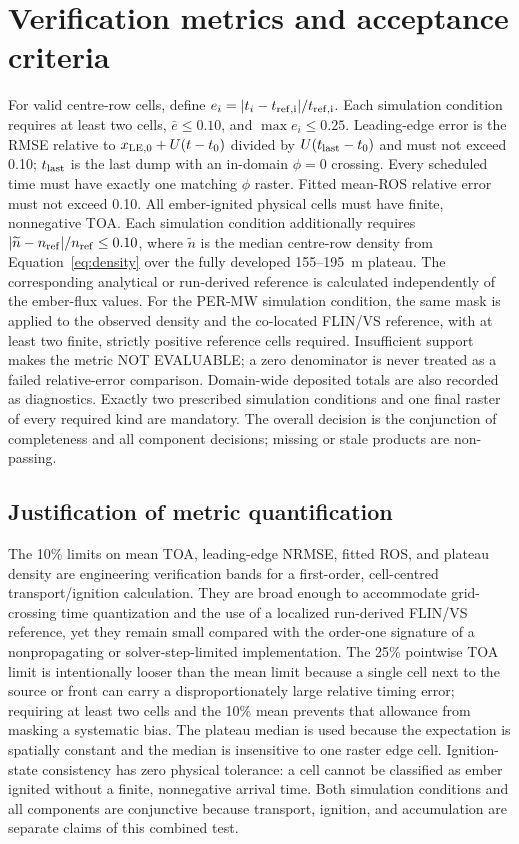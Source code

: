 \section{Verification metrics and acceptance criteria}
For valid centre-row cells, define $e_i=|t_i-t_{\rm ref,i}|/t_{\rm ref,i}$.
Each simulation condition requires at least two cells, $\bar e\le0.10$, and
$\max e_i\le0.25$. Leading-edge error is the RMSE relative to
$x_{\rm LE,0}+U(t-t_0)$ divided by $U(t_{\rm last}-t_0)$ and must not exceed
0.10; $t_{\rm last}$ is the last dump with an in-domain $\phi=0$ crossing.
Every scheduled time must have exactly one matching $\phi$ raster. Fitted mean-ROS relative
error must not exceed 0.10. All ember-ignited physical cells must have finite, nonnegative TOA.
Each simulation condition additionally requires
$|\widetilde n-n_{\rm ref}|/n_{\rm ref}\le0.10$, where
$\widetilde n$ is the median centre-row density from Equation~\ref{eq:density}
over the fully developed 155--195~m plateau. The corresponding analytical or
run-derived reference is calculated independently of the ember-flux values.
For the PER-MW simulation condition, the same mask is applied to the observed density and
the co-located FLIN/VS reference, with at least two finite, strictly positive
reference cells required. Insufficient support makes the metric NOT EVALUABLE;
a zero denominator is never treated as a failed relative-error comparison.
Domain-wide deposited totals are also recorded as diagnostics. Exactly two
prescribed simulation conditions and one final raster of every required
kind are mandatory. The overall decision is the conjunction of completeness and
all component decisions; missing or stale products are non-passing.

\subsection{Justification of metric quantification}

The 10\% limits on mean TOA, leading-edge NRMSE, fitted ROS, and plateau
density are engineering verification bands for a first-order, cell-centred
transport/ignition calculation.  They are broad enough to accommodate
grid-crossing time quantization and the use of a localized run-derived FLIN/VS
reference, yet they remain small compared with the order-one signature of a
nonpropagating or solver-step-limited implementation.  The 25\% pointwise TOA
limit is intentionally looser than the mean limit because a single cell next
to the source or front can carry a disproportionately large relative timing
error; requiring at least two cells and the 10\% mean prevents that allowance
from masking a systematic bias.  The plateau median is used because the
expectation is spatially constant and the median is insensitive to one raster
edge cell.  Ignition-state consistency has zero physical tolerance: a cell
cannot be classified as ember ignited without a finite, nonnegative arrival
time.  Both simulation conditions and all components are conjunctive because transport,
ignition, and accumulation are separate claims of this combined test.

